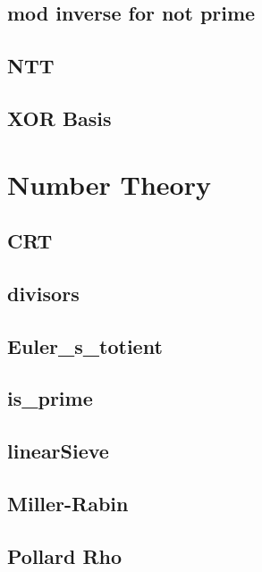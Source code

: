 ﻿\documentclass[10pt,twocolumn]{article}
\newcommand{\codefile}[1]{}}
\begin{document}
\subsection{mod inverse for not prime}
\codefile{Math/mod inverse for not prime.cpp}

\subsection{NTT}
\codefile{Math/NTT.cpp}

\subsection{XOR Basis}
\codefile{Math/XOR Basis.cpp}

\section{Number Theory}
\subsection{CRT}
\codefile{Number Theory/CRT.cpp}

\subsection{divisors}
\codefile{Number Theory/divisors.cpp}

\subsection{Euler\_s\_totient}
\codefile{Number Theory/Euler_s_totient.cpp}

\subsection{is\_prime}
\codefile{Number Theory/is_prime.cpp}

\subsection{linearSieve}
\codefile{Number Theory/linearSieve.cpp}

\subsection{Miller-Rabin}
\codefile{Number Theory/Miller-Rabin.cpp}

\subsection{Pollard Rho}
\codefile{Number Theory/Pollard Rho.cpp}
\end{document}
